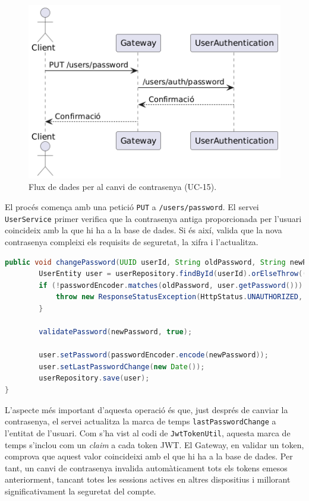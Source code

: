 \begin{figure}[H]
    \centering
    \includegraphics[width=1\textwidth]{Figures/flux/change_password_user.png}
    \caption{Flux de dades per al canvi de contrasenya (UC-15).}
\end{figure}

El procés comença amb una petició \texttt{PUT} a \texttt{/users/password}. El servei \texttt{UserService} primer verifica que la contrasenya antiga proporcionada per l'usuari coincideix amb la que hi ha a la base de dades. Si és així, valida que la nova contrasenya compleixi els requisits de seguretat, la xifra i l'actualitza.

\begin{lstlisting}[language=Java, caption={Implementació del canvi de contrasenya a UserService}]
    public void changePassword(UUID userId, String oldPassword, String newPassword) {
        UserEntity user = userRepository.findById(userId).orElseThrow(() -> new ResponseStatusException(HttpStatus.NOT_FOUND, "User not found"));
        if (!passwordEncoder.matches(oldPassword, user.getPassword())) {
            throw new ResponseStatusException(HttpStatus.UNAUTHORIZED, "Current password is incorrect");
        }
        
        validatePassword(newPassword, true);
        
        user.setPassword(passwordEncoder.encode(newPassword));
        user.setLastPasswordChange(new Date());
        userRepository.save(user);
}
\end{lstlisting}

L'aspecte més important d'aquesta operació és que, just després de canviar la contrasenya, el servei actualitza la marca de temps \texttt{lastPasswordChange} a l'entitat de l'usuari. Com s'ha vist al codi de \texttt{JwtTokenUtil}, aquesta marca de temps s'inclou com un \textit{claim} a cada token JWT. El Gateway, en validar un token, comprova que aquest valor coincideixi amb el que hi ha a la base de dades. Per tant, un canvi de contrasenya invalida automàticament tots els tokens emesos anteriorment, tancant totes les sessions actives en altres dispositius i millorant significativament la seguretat del compte.

